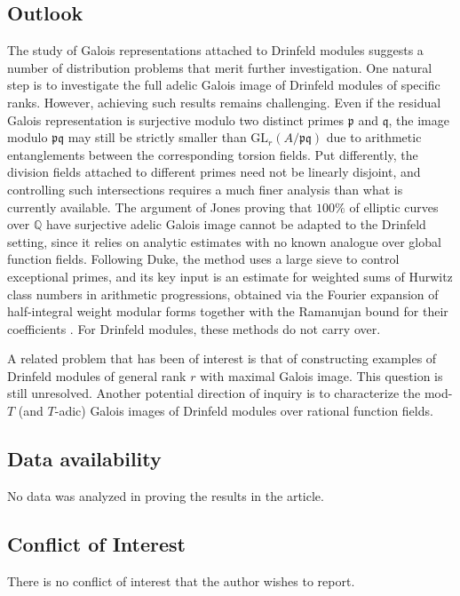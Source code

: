 \documentclass[11pt]{amsart}
\numberwithin{equation}{section}
\begin{document}
\subsection{Outlook} The study of Galois representations attached to Drinfeld modules suggests a number of distribution problems that merit further investigation. One natural step is to investigate the full adelic Galois image of Drinfeld modules of specific ranks. However, achieving such results remains challenging. Even if the residual Galois representation is surjective modulo two distinct primes $\mathfrak{p}$ and $\mathfrak{q}$, the image modulo $\mathfrak{p}\mathfrak{q}$ may still be strictly smaller than $\mathrm{GL}_r(A/\mathfrak{p}\mathfrak{q})$ due to arithmetic entanglements between the corresponding torsion fields. Put differently, the division fields attached to different primes need not be linearly disjoint, and controlling such intersections requires a much finer analysis than what is currently available. The argument of Jones proving that $100\%$ of elliptic curves over $\mathbb{Q}$ have surjective adelic Galois image cannot be adapted to the Drinfeld setting, since it relies on analytic estimates with no known analogue over global function fields. Following Duke, the method uses a large sieve to control exceptional primes, and its key input is an estimate for weighted sums of Hurwitz class numbers in arithmetic progressions, obtained via the Fourier expansion of half-integral weight modular forms together with the Ramanujan bound for their coefficients \cite[Lemma~3]{duke1997elliptic}. For Drinfeld modules, these methods do not carry over.
\par A related problem that has been of interest is that of constructing examples of Drinfeld modules of general rank $r$ with maximal Galois image. This question is still unresolved. Another potential direction of inquiry is to characterize the mod-$T$ (and $T$-adic) Galois images of Drinfeld modules over rational function fields.


\subsection*{Data availability} No data was analyzed in proving the results in the article.
\subsection*{Conflict of Interest} There is no conflict of interest that the author wishes to report.
\end{document}

